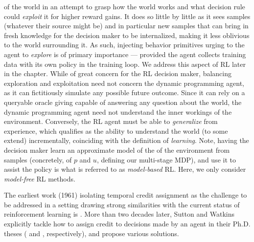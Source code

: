 of the world in an attempt to grasp how the world works and what decision rule could
\emph{exploit} it for higher reward gains.
It does so little by little as it sees samples (whatever their source might be)
and in particular new samples that can bring in fresh knowledge for the decision maker to be internalized,
making it less oblivious to the world surrounding it.
As such, injecting behavior primitives urging to the agent to \emph{explore} is of primary importance ---
provided the agent collects training data with its own policy in the training loop.
We address this aspect of RL later in the chapter.
While of great concern for the RL decision maker,
balancing exploration and exploitation need not concern the dynamic programming agent,
as it can fictitiously simulate any possible future outcome.
Since it can rely on a queryable oracle giving capable of answering any question about the world,
the dynamic programming agent need not understand the inner workings of the environment.
Conversely, the RL agent must be able to \emph{generalize} from experience,
which qualifies as the ability to understand the world (to some extend) incrementally,
coinciding with the definition of \textit{learning}.
Note, having the decision maker learn an approximate model of the of the environment from samples
(concretely, of $p$ and $u$, defining our multi-stage MDP),
and use it to assist the policy
is what is referred to as \textit{model-based} RL.
Here, we only consider \textit{model-free} RL methods.

The earliest work (1961) isolating temporal credit assignment as the challenge to be addressed
in a setting drawing strong similarities with the current status of reinforcement learning is
\cite{Minsky1961-qb}.
More than two decades later, Sutton and Watkins explicitly tackle
how to assign credit to decisions made by an agent
in their Ph.D. theses (\cite{Sutton1984-ce} and \cite{Watkins1989-ir}, respectively),
and propose various solutions.

